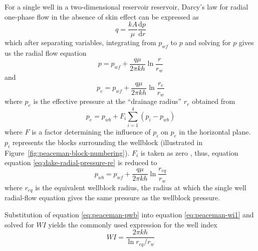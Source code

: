 For a single well in a two-dimensional reservoir reservoir, Darcy's law for radial one-phase flow in the absence of skin effect can be expressed as
\begin{equation}
    q = \frac{kA}{\mu} \frac{\mathrm{d}p}{\mathrm{d}r}
\end{equation}
which after separating variables, integrating from $p_{wf}$ to $p$ and solving for $p$ gives us the radial flow equation
\begin{equation}
    \label{eq:dake-radial-pressure}
    p = p_{wf} + \frac{q\mu}{2\pi kh} \ln{\frac{r}{r_w}}
\end{equation}
and
\begin{equation}
    \label{eq:dake-radial-pressure-re}
    p_e = p_{wf} + \frac{q\mu}{2\pi kh} \ln{\frac{r_e}{r_w}}
\end{equation}
where $p_e$ is the effective pressure at the ``drainage radius'' $r_e$ \cite{Dake1978Developments} obtained from
\begin{equation}
    \label{eq:peaceman-pe}
    p_e = p_{wb} + F_i \sum_{i=1}^{4}\left( p_i - p_{wb} \right)
\end{equation}
where $F$ is a factor determining the influence of $p_i$ on $p_e$ in the horizontal plane. $p_i$ represents the blocks surrounding the wellblock (illustrated in Figure~\ref{fig:peaceman-block-numbering}). $F_i$ is taken as zero \cite{Schwabe1967Prediction,Peaceman1978Interpretation}, thus, equation equation \eqref{eq:dake-radial-pressure-re} is reduced to
\begin{equation}
    \label{eq:peaceman-pwb}
    p_{wb} = p_{wf} + \frac{q\mu}{2\pi kh} \ln{\frac{r_{eq}}{r_w}}
\end{equation}
where $r_{eq}$ is the equivalent wellblock radius, the radius at which the single well radial-flow equation gives the same pressure as the wellblock pressure\cite{Peaceman1978Interpretation,Peaceman2003New}.

Substitution of equation \eqref{eq:peaceman-pwb} into equation \eqref{eq:peaceman-wi1} and solved for $WI$ yields the commonly used expression for the well index
\begin{equation}
    \label{eq:peaceman-wi2}
    WI = \frac{2\pi kh}{\ln{r_{eq}/r_w}}
\end{equation}


